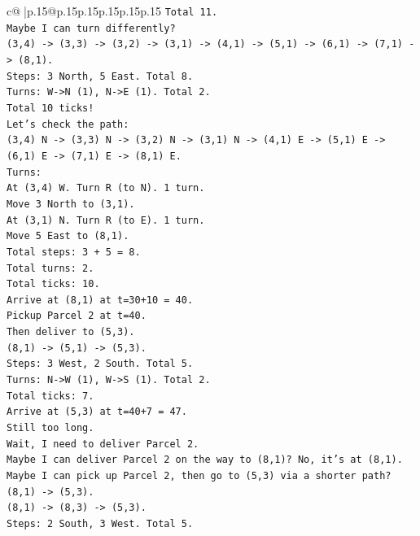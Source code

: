 \documentclass{article}
\begin{document}
{\begin{supertabular}{c@{$\;$}|p{.15\linewidth}@{}p{.15\linewidth}p{.15\linewidth}p{.15\linewidth}p{.15\linewidth}p{.15\linewidth}}
{{{\texttt{Total 11.} \\
\texttt{Maybe I can turn differently?} \\
\texttt{(3,4) {-}> (3,3) {-}> (3,2) {-}> (3,1) {-}> (4,1) {-}> (5,1) {-}> (6,1) {-}> (7,1) {-}> (8,1).} \\
\texttt{Steps: 3 North, 5 East. Total 8.} \\
\texttt{Turns: W{-}>N (1), N{-}>E (1). Total 2.} \\
\texttt{Total 10 ticks!} \\
\texttt{Let's check the path:} \\
\texttt{(3,4) N {-}> (3,3) N {-}> (3,2) N {-}> (3,1) N {-}> (4,1) E {-}> (5,1) E {-}> (6,1) E {-}> (7,1) E {-}> (8,1) E.} \\
\texttt{Turns:} \\
\texttt{At (3,4) W. Turn R (to N). 1 turn.} \\
\texttt{Move 3 North to (3,1).} \\
\texttt{At (3,1) N. Turn R (to E). 1 turn.} \\
\texttt{Move 5 East to (8,1).} \\
\texttt{Total steps: 3 + 5 = 8.} \\
\texttt{Total turns: 2.} \\
\texttt{Total ticks: 10.} \\
\texttt{Arrive at (8,1) at t=30+10 = 40.} \\
\texttt{Pickup Parcel 2 at t=40.} \\
\texttt{Then deliver to (5,3).} \\
\texttt{(8,1) {-}> (5,1) {-}> (5,3).} \\
\texttt{Steps: 3 West, 2 South. Total 5.} \\
\texttt{Turns: N{-}>W (1), W{-}>S (1). Total 2.} \\
\texttt{Total ticks: 7.} \\
\texttt{Arrive at (5,3) at t=40+7 = 47.} \\
\texttt{Still too long.} \\
\texttt{Wait, I need to deliver Parcel 2.} \\
\texttt{Maybe I can deliver Parcel 2 on the way to (8,1)? No, it's at (8,1).} \\
\texttt{Maybe I can pick up Parcel 2, then go to (5,3) via a shorter path?} \\
\texttt{(8,1) {-}> (5,3).} \\
\texttt{(8,1) {-}> (8,3) {-}> (5,3).} \\
\texttt{Steps: 2 South, 3 West. Total 5.} \\
}}}
\end{supertabular}}
\end{document}
